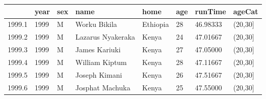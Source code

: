 \documentclass[11pt]{article}
\begin{document}
    \begin{tabular}{r|lllllll}
  & year & sex & name & home & age & runTime & ageCat\\
\hline
	1999.1 & 1999                   & M                      & Worku Bikila           & Ethiopia               & 28                     & 46.98333               & (20,30{]}             \\
	1999.2 & 1999                   & M                      & Lazarus Nyakeraka      & Kenya                  & 24                     & 47.01667               & (20,30{]}             \\
	1999.3 & 1999                   & M                      & James Kariuki          & Kenya                  & 27                     & 47.05000               & (20,30{]}             \\
	1999.4 & 1999                   & M                      & William Kiptum         & Kenya                  & 28                     & 47.11667               & (20,30{]}             \\
	1999.5 & 1999                   & M                      & Joseph Kimani          & Kenya                  & 26                     & 47.51667               & (20,30{]}             \\
	1999.6 & 1999                   & M                      & Josphat Machuka        & Kenya                  & 25                     & 47.55000               & (20,30{]}             \\
\end{tabular}
\end{document}
